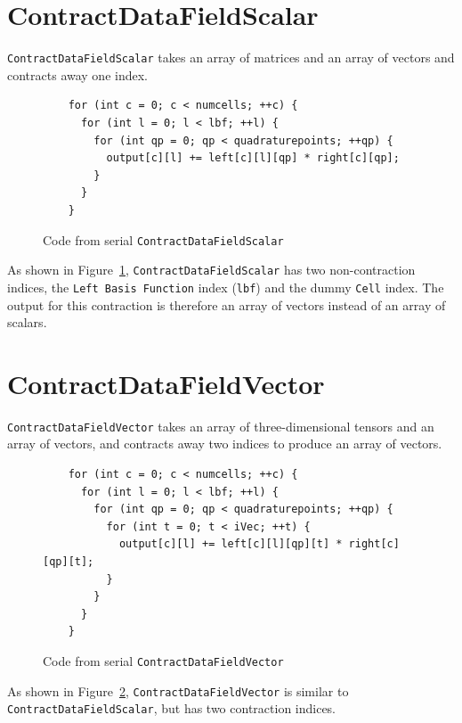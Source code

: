 \section{ContractDataFieldScalar}

\texttt{ContractDataFieldScalar} takes an array of matrices and an array of
vectors and contracts away one index.

\begin{figure}[ht]
    \begin{lstlisting}
    for (int c = 0; c < numcells; ++c) {
      for (int l = 0; l < lbf; ++l) {
        for (int qp = 0; qp < quadraturepoints; ++qp) {
          output[c][l] += left[c][l][qp] * right[c][qp];
        }
      }
    }
    \end{lstlisting}
\caption{Code from serial \texttt{ContractDataFieldScalar}
\label{lst:ContractDataFieldScalarSerial}} 
\end{figure}

As shown in Figure~\ref{lst:ContractDataFieldScalarSerial},
\texttt{ContractDataFieldScalar} has two non-contraction indices, the
\texttt{Left Basis Function} index (\texttt{lbf}) and the dummy \texttt{Cell} index. The
output for this contraction is therefore an array of vectors instead of an array
of scalars.

\section{ContractDataFieldVector}
\texttt{ContractDataFieldVector} takes an array of three-dimensional tensors and
an array of vectors, and contracts away two indices to produce an array of
vectors.

\begin{figure}[ht]
    \begin{lstlisting}
    for (int c = 0; c < numcells; ++c) {
      for (int l = 0; l < lbf; ++l) {
        for (int qp = 0; qp < quadraturepoints; ++qp) {
          for (int t = 0; t < iVec; ++t) {
            output[c][l] += left[c][l][qp][t] * right[c][qp][t];
          }
        }
      }
    }
    \end{lstlisting}
\caption{Code from serial \texttt{ContractDataFieldVector}
\label{lst:ContractDataFieldVectorSerial}} 
\end{figure}

As shown in Figure~\ref{lst:ContractDataFieldVectorSerial},
\texttt{ContractDataFieldVector} is similar to \texttt{ContractDataFieldScalar},
but has two contraction indices. 

